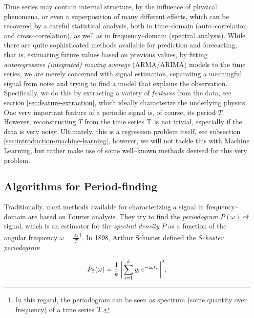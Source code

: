 Time series may contain internal structure, \eg by the influence of physical phenomena, or even a superposition of many different effects, which can be recovered by a careful statistical analysis, both in time--domain (auto--correlation and cross--correlation), as well as in frequency--domain (spectral analysis). While there are quite sophisticated methods available for prediction and forecasting, that is, estimating future values based on previous values, \eg by fitting \emph{autoregressive (integrated) moving average} (ARMA/ARIMA) models to the time series, we are merely concerned with signal estimation, \ie separating a meaningful signal from noise and trying to find a model that explains the observation. Specifically, we do this by extracting a variety of \emph{features} from the data, see section \ref{sec:feature-extraction}, which ideally characterize the underlying physics.\\

One very important feature of a periodic signal is, of course, its period $T$. However, reconstructing $T$ from the time series $\mathrm{T}$ is not trivial, especially if the data is very noisy. Ultimately, this is a regression problem itself, see subsection \ref{sec:introduction-machine-learning}, however, we will not tackle this with Machine Learning, but rather make use of some well--known methods devised for this very problem.

\subsection{Algorithms for Period-finding}
\label{subsec:period-finding}

Traditionally, most methods available for characterizing a signal in frequency--domain are based on Fourier analysis. They try to find the \emph{periodogram} $P(\omega)$ of signal, which is an estimator for the \emph{spectral density} $P$ as a function of the angular frequency $\omega = \frac{2 \pi}{T}$\footnote{In this regard, the periodogram can be seen as spectrum (some quantity over frequency) of a time series $\mathrm{T}$.}. In 1898, Arthur Schuster defined the \emph{Schuster periodogram}

\begin{equation}
\label{eg:schuster-periodogram}
P_{\text{S}}(\omega) = \frac{1}{k} \, \biggl| \, \sum\limits_{i=1}^{k} y_i \, \mathrm{e}^{-\mathrm{i} \omega t_i} \, \biggr|^2,
\end{equation}


